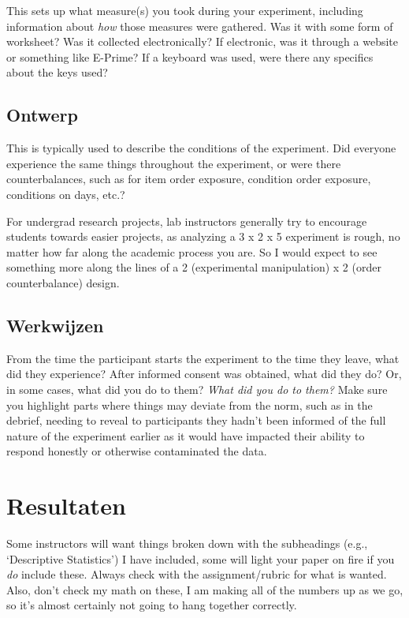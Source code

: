 \documentclass[stu,12pt,floatsintext]{apa7}
\begin{document}
This sets up what measure(s) you took during your experiment, including information about \textit{how} those measures were gathered. Was it with some form of worksheet? Was it collected electronically? If electronic, was it through a website or something like E-Prime? If a keyboard was used, were there any specifics about the keys used?

\subsection{Ontwerp}

This is typically used to describe the conditions of the experiment. Did everyone experience the same things throughout the experiment, or were there counterbalances, such as for item order exposure, condition order exposure, conditions on days, etc.? 

For undergrad research projects, lab instructors generally try to encourage students towards easier projects, as analyzing a 3 x 2 x 5 experiment is rough, no matter how far along the academic process you are. So I would expect to see something more along the lines of a 2 (experimental manipulation) x 2 (order counterbalance) design.


\subsection{Werkwijzen}

From the time the participant starts the experiment to the time they leave, what did they experience? After informed consent was obtained, what did they do? Or, in some cases, what did you do to them? \textit{What did you do to them?} Make sure you highlight parts where things may deviate from the norm, such as in the debrief, needing to reveal to participants they hadn't been informed of the full nature of the experiment earlier as it would have impacted their ability to respond honestly or otherwise contaminated the data.



\section{Resultaten}

Some instructors will want things broken down with the subheadings (e.g., `Descriptive Statistics') I have included, some will light your paper on fire if you \textit{do} include these. Always check with the assignment/rubric for what is wanted. Also, don't check my math on these, I am making all of the numbers up as we go, so it's almost certainly not going to hang together correctly.
\end{document}

